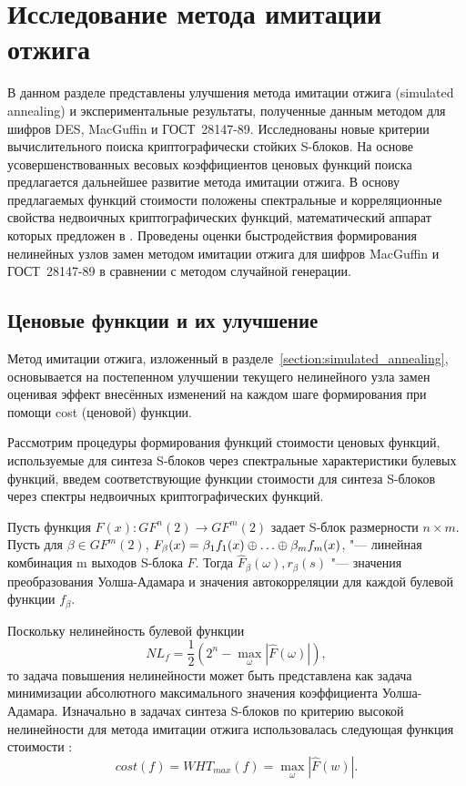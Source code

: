\chapter{Исследование метода имитации отжига}
\label{chapter:simulated_annealing}

В данном разделе представлены улучшения метода имитации отжига (simulated
annealing) и экспериментальные результаты, полученные данным методом для шифров
DES, MacGuffin и ГОСТ~28147-89. Исследнованы новые критерии вычислительного
поиска криптографически стойких S-блоков. На основе усовершенствованных весовых
коэффициентов ценовых функций поиска предлагается дальнейшее развитие метода
имитации отжига. В основу предлагаемых функций стоимости положены спектральные и
корреляционные свойства недвоичных криптографических функций, математический
аппарат которых предложен в \cite{Kuznetsov}. Проведены оценки быстродействия
формирования нелинейных узлов замен методом имитации отжига для шифров MacGuffin
и ГОСТ~28147-89 в сравнении с методом случайной генерации.

\section{Ценовые функции и их улучшение}

Метод имитации отжига, изложенный в разделе~\ref{section:simulated_annealing},
основывается на постепенном улучшении текущего нелинейного узла замен оценивая
эффект внесённых изменений на каждом шаге формирования при помощи cost (ценовой)
функции.

Рассмотрим процедуры формирования функций стоимости ценовых функций,
используемые для синтеза S-блоков через спектральные характеристики булевых
функций, введем соответствующие функции стоимости для синтеза S-блоков через
спектры недвоичных криптографических функций.

Пусть функция $F(x):GF^{n}(2)\rightarrow GF^{m}(2)$ задает S-блок размерности $n \times m$.
Пусть для $\beta \in GF^{m}(2)$, $F_{\beta}(x) = \beta_{1}f_{1}(x) \oplus \ldots \oplus \beta_{m}f_{m}(x)$, "---
линейная комбинация m выходов S-блока $F$. Тогда $\hat{F}_{\beta}(\omega), r_{\beta}(s)$
"--- значения преобразования Уолша-Адамара и значения автокорреляции для каждой булевой функции $f_{\beta}$.

Поскольку нелинейность булевой функции
\begin{equation}NL_f=\frac{1}{2}(2^n - \max_{\omega}|\hat{F}(\omega)|),\end{equation}
то задача повышения нелинейности может быть представлена как задача минимизации
абсолютного максимального значения коэффициента Уолша-Адамара. Изначально в
задачах синтеза S-блоков по критерию высокой нелинейности для метода имитации
отжига использовалась следующая функция стоимости \cite{Clark1}:
\begin{equation}cost(f) = WHT_{max}(f) = \max_{\omega}|\hat{F}(w)|.\end{equation}

